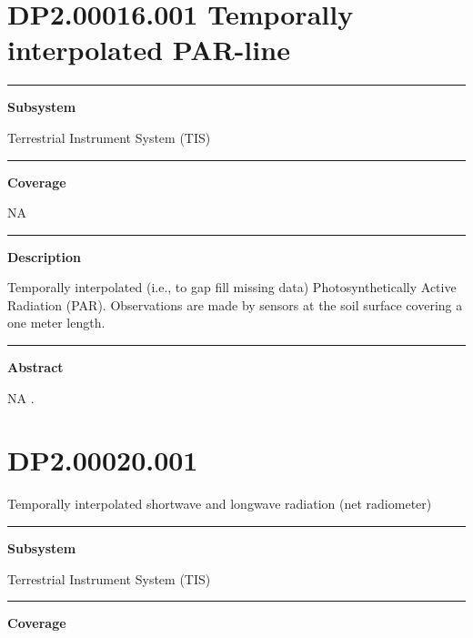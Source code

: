 \documentclass[]{article}
\begin{document}
\section{DP2.00016.001 Temporally interpolated
PAR-line}\label{dp2.00016.001-temporally-interpolated-par-line}

\begin{center}\rule{0.5\linewidth}{\linethickness}\end{center}

\textbf{Subsystem}

Terrestrial Instrument System (TIS)

\begin{center}\rule{0.5\linewidth}{\linethickness}\end{center}

\textbf{Coverage}

NA

\begin{center}\rule{0.5\linewidth}{\linethickness}\end{center}

\textbf{Description}

Temporally interpolated (i.e., to gap fill missing data)
Photosynthetically Active Radiation (PAR). Observations are made by
sensors at the soil surface covering a one meter length.

\begin{center}\rule{0.5\linewidth}{\linethickness}\end{center}

\textbf{Abstract}

NA \newpage
.

\section{DP2.00020.001}\label{dp2.00020.001}

Temporally interpolated shortwave and longwave radiation (net
radiometer)

\begin{center}\rule{0.5\linewidth}{\linethickness}\end{center}

\textbf{Subsystem}

Terrestrial Instrument System (TIS)

\begin{center}\rule{0.5\linewidth}{\linethickness}\end{center}

\textbf{Coverage}
\end{document}
